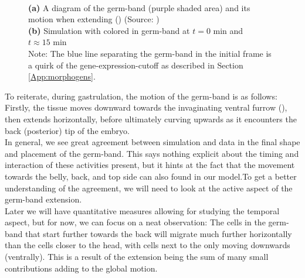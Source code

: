 \begin{figure}[H]
\begin{subfigure}[b]{0.61\textwidth}
    \caption{}
    \end{subfigure}
    \caption{\\
    \textbf{(a)} A diagram of the germ-band (purple shaded area) and its motion when extending () (Source: )\\
    \textbf{(b)} Simulation with colored in germ-band at $t = 0 \text{ min}$ and $t \approx 15 \text{ min}$\\Note: The blue line separating the germ-band in the initial frame is a quirk of the gene-expression-cutoff as described in Section \ref{App:morphogens}.}
    \label{fig:germbandCompare}
\end{figure}



To reiterate, during gastrulation, the motion of the germ-band is as follows:\\Firstly, the tissue moves downward towards the invaginating ventral furrow (), then extends horizontally, before ultimately curving upwards as it encounters the back (posterior) tip of the embryo.\\

In general, we see great agreement between simulation and data in the final shape and placement of the germ-band. This says nothing explicit about the timing and interaction of these activities present, but it hints at the fact that the movement towards the belly, back, and top side can also found in our model.\reph To get a better understanding of the agreement, we will need to look at the active aspect of the germ-band extension.\\

Later we will have quantitative measures allowing for studying the temporal aspect, but for now, we can focus on a neat observation: The cells in the germ-band that start further towards the back will migrate much further horizontally than the cells closer to the head, with cells next to the  only moving downwards (ventrally). This is a result of the extension being the sum of many small contributions adding to the global motion. 

